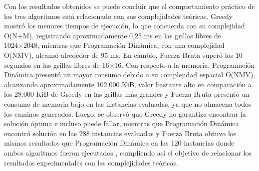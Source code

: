 Con los resultados obtenidos se puede concluir que el comportamiento práctico de los tres algoritmos está relacionado con sus complejidades teóricas. Greedy mostró los menores tiempos de ejecución, lo que concuerda con su complejidad O(N+M), registrando aproximadamente 0,25 ms en las grillas libres de 1024×2048, mientras que Programación Dinámica, con una complejidad O(NMV), alcanzó alrededor de 95 ms. En cambio, Fuerza Bruta superó los 10 segundos en las grillas libres de 16×16. Con respecto a la memoria, Programación Dinámica presentó un mayor consumo debido a su complejidad espacial O(NMV), alcanzando aproximadamente 102.000 KiB, valor bastante alto en comparación a los 28.000 KiB de Greedy en las grillas más grandes y Fuerza Bruta presentó un consumo de memoria bajo en las instancias evaluadas, ya que no almacena todos los caminos generados. Luego, se observó que Greedy no garantiza encontrar la solución óptima e incluso puede fallar, mientras que Programación Dinámica encontró solución en las 288 instancias evaluadas y Fuerza Bruta obtuvo los mismos resultados que Programación Dinámica en las 120 instancias donde ambos algoritmos fueron ejecutados , cumpliendo así el objetivo de relacionar los resultados experimentales con las complejidades teóricas.
